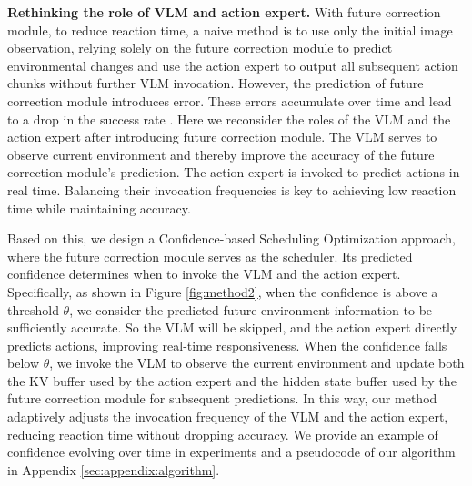 \textbf{Rethinking the role of VLM and action expert.}
With future correction module, to reduce reaction time, a naive method is to use only the initial image observation, relying solely on the future correction module to predict environmental changes and use the action expert to output all subsequent action chunks without further VLM invocation. 
However, the prediction of future correction module introduces error. These errors accumulate over time and lead to a drop in the success rate \cite{liu2026latent}.
Here we reconsider the roles of the VLM and the action expert after introducing future correction module. The VLM serves to observe current environment and thereby improve the accuracy of the future correction module's prediction. The action expert is invoked to predict actions in real time. Balancing their invocation frequencies is key to achieving low reaction time while maintaining accuracy.


Based on this, we design a Confidence-based Scheduling Optimization approach, where the future correction module serves as the scheduler. Its predicted confidence determines when to invoke the VLM and the action expert. Specifically, as shown in Figure \ref{fig:method2}, when the confidence is above a threshold $\theta$, we consider the predicted future environment information to be sufficiently accurate. So the VLM will be skipped, and the action expert directly predicts actions, improving real-time responsiveness. When the confidence falls below $\theta$, we invoke the VLM to observe the current environment and update both the KV buffer used by the action expert and the hidden state buffer used by the future correction module for subsequent predictions. 
In this way, our method adaptively adjusts the invocation frequency of the VLM and the action expert, reducing reaction time without dropping accuracy. 
We provide an example of confidence evolving over time in experiments and a pseudocode of our algorithm in Appendix \ref{sec:appendix:algorithm}.


